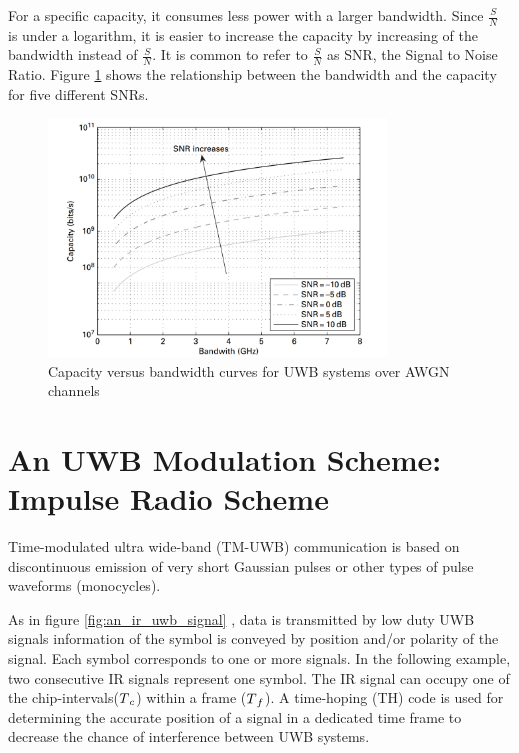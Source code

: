 \documentclass[\main/main.tex]{subfiles}
\begin{document}
For a specific capacity, it consumes less power with a larger bandwidth. Since $\frac{S}{N}$ is under a logarithm, it is easier to increase the capacity by increasing of the bandwidth instead of $\frac{S}{N}$. It is common to refer to $\frac{S}{N}$ as SNR, the Signal to Noise Ratio. Figure \ref{fig:capacity_versus_bandwidth_curves_for_uwb_systems_over_awgn_channels} \cite{ultra_wideband_positioning_systems} shows the relationship between the bandwidth and the capacity for five different SNRs.

\begin{figure}[H]
    \centering
    \includegraphics[width=0.8\textwidth]{capacity_versus_bandwidth_curves_for_uwb_systems_over_awgn_channels}
    \caption{Capacity versus bandwidth curves for UWB systems over AWGN channels}
    \label{fig:capacity_versus_bandwidth_curves_for_uwb_systems_over_awgn_channels}
\end{figure}

\section{An UWB Modulation Scheme: Impulse Radio Scheme}

Time-modulated ultra wide-band (TM-UWB) communication is based on discontinuous emission of very short Gaussian pulses or other types of pulse waveforms (monocycles).

As in figure \ref{fig:an_ir_uwb_signal} \cite{ultra_wideband_positioning_systems}, data is transmitted by low duty UWB signals information of the symbol is conveyed by position and/or polarity of the signal. Each symbol corresponds to one or more signals. In the following example, two consecutive IR signals represent one symbol. The IR signal can occupy one of the chip-intervals($T\textsubscript{$c$}$) within a frame ($T\textsubscript{$f$}$). A time-hoping (TH) code is used for determining the accurate position of a signal in a dedicated time frame to decrease the chance of interference between UWB systems. 
\end{document}
